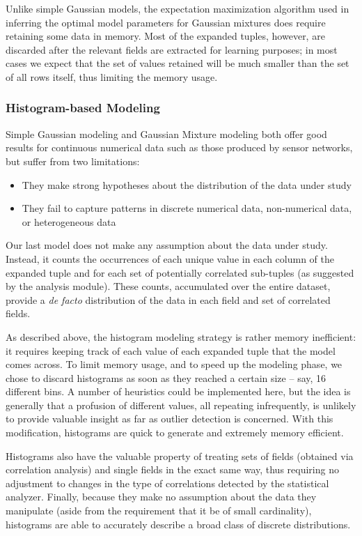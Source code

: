 Unlike simple Gaussian models, the expectation maximization algorithm used in inferring the optimal model parameters for Gaussian mixtures does require retaining some data in memory. Most of the expanded tuples, however, are discarded after the relevant fields are extracted for learning purposes; in most cases we expect that the set of values retained will be much smaller than the set of all rows itself, thus limiting the memory usage.

\subsubsection{Histogram-based Modeling}
Simple Gaussian modeling and Gaussian Mixture modeling both offer good results for continuous numerical data such as those produced by sensor networks, but suffer from two limitations:

\begin{itemize}
\item They make strong hypotheses about the distribution of the data under study
\item They fail to capture patterns in discrete numerical data, non-numerical data, or heterogeneous data
\end{itemize}

Our last model does not make any assumption about the data under study. Instead, it counts the occurrences of each unique value in each column of the expanded tuple and for each set of potentially correlated sub-tuples (as suggested by the analysis module). These counts, accumulated over the entire dataset, provide a \emph{de facto} distribution of the data in each field and set of correlated fields. 

As described above, the histogram modeling strategy is rather memory inefficient: it requires keeping track of each value of each expanded tuple that the model comes across. To limit memory usage, and to speed up the modeling phase, we chose to discard histograms as soon as they reached a certain size -- say, 16 different bins. A number of heuristics could be implemented here, but the idea is generally that a profusion of different values, all repeating infrequently, is unlikely to provide valuable insight as far as outlier detection is concerned. With this modification, histograms are quick to generate and extremely memory efficient. 

Histograms also have the valuable property of treating sets of fields (obtained via correlation analysis) and single fields in the exact same way, thus requiring no adjustment to changes in the type of correlations detected by the statistical analyzer. Finally, because they make no assumption about the data they manipulate (aside from the requirement that it be of small cardinality), histograms are able to accurately describe a broad class of discrete distributions.